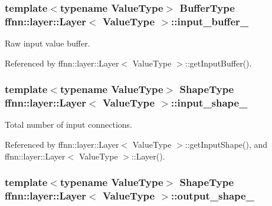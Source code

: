 \hypertarget{classffnn_1_1layer_1_1_layer_ad4b5ac0708d6ada04d62df4fad377f1a}{
\subsubsection[{input\-\_\-buffer\-\_\-}]{\setlength{\rightskip}{0pt plus 5cm}template$<$typename Value\-Type$>$ {\bf Buffer\-Type} {\bf ffnn\-::layer\-::\-Layer}$<$ Value\-Type $>$\-::input\-\_\-buffer\-\_\-\hspace{0.3cm}{\ttfamily [protected]}}}\label{classffnn_1_1layer_1_1_layer_ad4b5ac0708d6ada04d62df4fad377f1a}


Raw input value buffer. 



Referenced by ffnn\-::layer\-::\-Layer$<$ Value\-Type $>$\-::get\-Input\-Buffer().

\hypertarget{classffnn_1_1layer_1_1_layer_a07cc49b6890743a8045e3adc7c07aca5}{
\subsubsection[{input\-\_\-shape\-\_\-}]{\setlength{\rightskip}{0pt plus 5cm}template$<$typename Value\-Type$>$ {\bf Shape\-Type} {\bf ffnn\-::layer\-::\-Layer}$<$ Value\-Type $>$\-::input\-\_\-shape\-\_\-\hspace{0.3cm}{\ttfamily [protected]}}}\label{classffnn_1_1layer_1_1_layer_a07cc49b6890743a8045e3adc7c07aca5}


Total number of input connections. 



Referenced by ffnn\-::layer\-::\-Layer$<$ Value\-Type $>$\-::get\-Input\-Shape(), and ffnn\-::layer\-::\-Layer$<$ Value\-Type $>$\-::\-Layer().

\hypertarget{classffnn_1_1layer_1_1_layer_a453330bda96277cd7b794bfab4804c47}{
\subsubsection[{output\-\_\-shape\-\_\-}]{\setlength{\rightskip}{0pt plus 5cm}template$<$typename Value\-Type$>$ {\bf Shape\-Type} {\bf ffnn\-::layer\-::\-Layer}$<$ Value\-Type $>$\-::output\-\_\-shape\-\_\-\hspace{0.3cm}{\ttfamily [protected]}}}\label{classffnn_1_1layer_1_1_layer_a453330bda96277cd7b794bfab4804c47}



